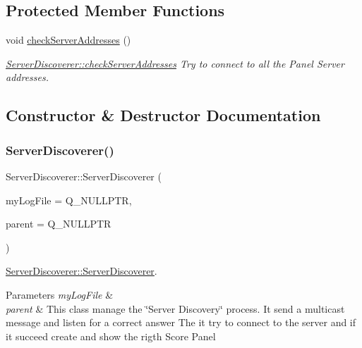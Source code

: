 \subsection*{Protected Member Functions}
\begin{DoxyCompactItemize}
\item 
\mbox{\label{classServerDiscoverer_a7d9af0e71fd220f7cd1878e37c7c927d}} 
void \mbox{\hyperlink{classServerDiscoverer_a7d9af0e71fd220f7cd1878e37c7c927d}{check\+Server\+Addresses}} ()
\begin{DoxyCompactList}\small\item\em \mbox{\hyperlink{classServerDiscoverer_a7d9af0e71fd220f7cd1878e37c7c927d}{Server\+Discoverer\+::check\+Server\+Addresses}} Try to connect to all the Panel Server addresses. \end{DoxyCompactList}\end{DoxyCompactItemize}


\subsection{Constructor \& Destructor Documentation}
\mbox{\label{classServerDiscoverer_a2c2b628630dc1928302e02768baa4837}} 
\subsubsection{\texorpdfstring{Server\+Discoverer()}{ServerDiscoverer()}}
{\footnotesize\ttfamily Server\+Discoverer\+::\+Server\+Discoverer (\begin{DoxyParamCaption}\item[{Q\+File $\ast$}]{my\+Log\+File = {\ttfamily Q\+\_\+NULLPTR},  }\item[{Q\+Object $\ast$}]{parent = {\ttfamily Q\+\_\+NULLPTR} }\end{DoxyParamCaption})\hspace{0.3cm}{\ttfamily [explicit]}}



\mbox{\hyperlink{classServerDiscoverer_a2c2b628630dc1928302e02768baa4837}{Server\+Discoverer\+::\+Server\+Discoverer}}. 


\begin{DoxyParams}{Parameters}
{\em my\+Log\+File} & \\
\hline
{\em parent} & This class manage the \char`\"{}\+Server Discovery\char`\"{} process. It send a multicast message and listen for a correct answer The it try to connect to the server and if it succeed create and show the rigth Score Panel \\
\hline
\end{DoxyParams}


